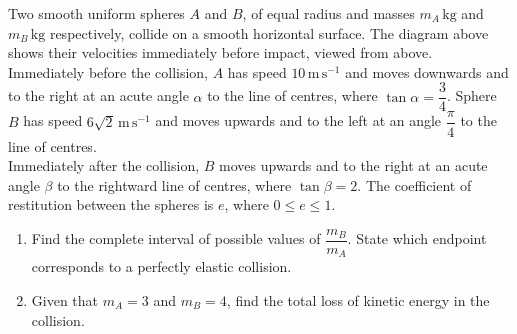 \documentclass[leqno]{article}
\begin{document}
\begin{enumerate}[
  label=\textbf{\arabic*.},
  leftmargin=*,
  topsep=0pt,
  partopsep=0pt,
  parsep=0pt
]
\questionitem

\begin{figure}[H]
    \centering
{}
\end{figure}


Two smooth uniform spheres $A$ and $B$, of equal radius and masses $m_A\,\mathrm{kg}$ and $m_B\,\mathrm{kg}$ respectively, collide on a smooth horizontal surface. The diagram above shows their velocities immediately before impact, viewed from above. \\

Immediately before the collision, $A$ has speed $10\,\mathrm{m\,s^{-1}}$ and moves downwards and to the right at an acute angle $\alpha$ to the line of centres, where $\tan\alpha=\dfrac{3}{4}$. Sphere $B$ has speed $6\sqrt{2}\,\mathrm{m\,s^{-1}}$ and moves upwards and to the left at an angle $\dfrac{\pi}{4}$ to the line of centres. \\

Immediately after the collision, $B$ moves upwards and to the right at an acute angle $\beta$ to the rightward line of centres, where $\tan\beta=2$. The coefficient of restitution between the spheres is $e$, where $0\leq e\leq1$. \\
\begin{enumerate}[label=\textbf{(\alph*)}]
\item Find the complete interval of possible values of $\dfrac{m_B}{m_A}$. State which endpoint corresponds to a perfectly elastic collision.  \\
\item Given that $m_A=3$ and $m_B=4$, find the total loss of kinetic energy in the collision.  \\
\end{enumerate}


\end{enumerate}
\end{document}
